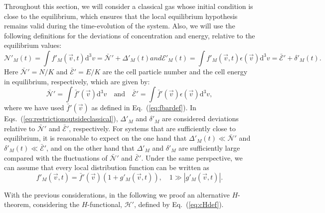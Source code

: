 Throughout this section, we will consider a classical gas
whose initial condition is close to the equilibrium,
which ensures that the local equilibrium hypothesis remains valid during
the time-evolution of the system.
Also, we will use the following definitions for the deviations of concentration 
and energy, relative to the equilibrium values:
\begin{subequations}\label{eq:restrictionoutsideclassical}
%
\begin{equation}
      \mathcal{N}'_M(t)=\int f'_{M}(\vec{v},t) \mathrm{d}^{3}v=
      \bar{\mathcal{N}}'+\Delta'_M(t)
\end{equation}
%
and
%
\begin{equation}
      \mathcal{E}'_M(t)=\int f'_{M}(\vec{v},t) \epsilon(\vec{v}) \mathrm{d}^{3}v=
      \bar{\mathcal{E}}'+ \delta'_M(t).
\end{equation}
\end{subequations}
%
Here $\bar {\mathcal{N}}' =N/K$ and $\bar{\mathcal{E}}'=E/K$ are
the cell particle number and the cell energy in equilibrium, respectively, which are given by:
%
    \begin{equation}
      \bar{\mathcal{N}}'=
      \int \bar{f}'(\vec{v}) \mathrm{d}^{3}v\quad\textrm{and} \quad
      \bar{\mathcal{E}}'=
      \int \bar{f}'(\vec{v})\epsilon(\vec{v}) \mathrm{d}^{3}v,
    \end{equation}
where we have used $\bar{f}'(\vec{v})$ as defined in Eq.~(\ref{eq:fbardef}).
In Eqs.~(\ref{eq:restrictionoutsideclassical}), $\Delta'_M$ and $\delta'_M$
are considered deviations relative to
$\bar{\mathcal{N}}'$ and $\bar{\mathcal{E}}'$, respectively. For systems that are
sufficiently close to equilibrium, it is reasonable to expect on the one hand that
$\Delta'_M(t)\ll\bar{\mathcal{N}}'$ and
$\delta'_M(t)\ll\bar{\mathcal{E}}'$, and on the other hand that $\Delta'_M$ and
$\delta'_M$ are sufficiently large compared with the fluctuations of $\bar{\mathcal{N}}'$
and $\bar{\mathcal{E}}'$. Under the same perspective, we can assume that every local
distribution function can be written as
\begin{equation}\label{eq:firstorder}
   f'_{M}(\vec{v},t)=\bar{f}'(\vec{v})(1+g'_{M}(\vec{v},t)),\quad
   1\gg|g'_{M}(\vec{v},t)|.
\end{equation}
%

With the previous considerations, in the following we proof an alternative
$H$-theorem, considering the $H$-functional, $\mathcal{H}'$, defined by Eq.~(\ref{eq:cHdef}).

